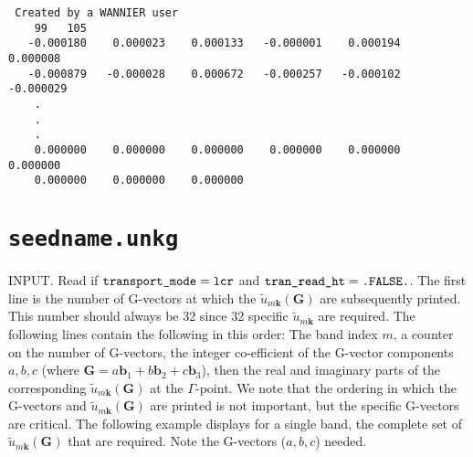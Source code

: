 \begin{verbatim}
 Created by a WANNIER user
    99   105
   -0.000180    0.000023    0.000133   -0.000001    0.000194    0.000008
   -0.000879   -0.000028    0.000672   -0.000257   -0.000102   -0.000029
    .
    .
    .
    0.000000    0.000000    0.000000    0.000000    0.000000    0.000000
    0.000000    0.000000    0.000000
\end{verbatim}

\section{{\tt seedname.unkg}}
\label{sec:files_unkg}

INPUT.
Read if $\verb#transport_mode#=\verb#lcr#$
and $\verb#tran_read_ht#=\verb#.FALSE.#$.
The first line is the number of G-vectors at which the
$\tilde{u}_{m\mathbf{k}}(\mathbf{G})$ are subsequently
printed. This number should always be 32 since 32 
specific $\tilde{u}_{m\mathbf{k}}$ are required.
The following lines contain the following in this order:
The band index $m$, a counter on the number of G-vectors,
the integer co-efficient of the G-vector components $a,b,c$
(where $\mathbf{G}=a\mathbf{b}_1+b\mathbf{b}_2+c\mathbf{b}_3$),
then the real and imaginary parts of the corresponding
$\tilde{u}_{m\mathbf{k}}(\mathbf{G})$ at the $\Gamma$-point. 
We note that the ordering in which the G-vectors and 
$\tilde{u}_{m\mathbf{k}}(\mathbf{G})$ are printed is not 
important, but the specific G-vectors are critical. The following 
example displays for a single band, the complete set of 
$\tilde{u}_{m\mathbf{k}}(\mathbf{G})$ that are required.
Note the G-vectors ($a,b,c$) needed.
 
